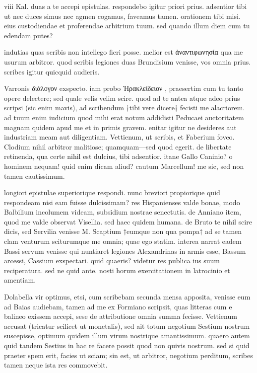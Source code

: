 


 viii Kal. duas a te accepi epistulas. respondebo igitur priori prius. adsentior tibi ut nec duces simus nec agmen cogamus, faveamus tamen. orationem tibi misi. eius custodiendae et proferendae arbitrium tuum. sed quando illum diem cum tu edendam putes?

 indutias quas scribis non intellego fieri posse. melior est ἀναντιφωνησία qua me usurum arbitror. quod scribis legiones duas Brundisium venisse, vos omnia prius. scribes igitur quicquid audieris.

 Varronis διάλογον exspecto. iam probo Ἡρακλείδειον , praesertim cum tu tanto opere delectere; sed quale velis velim scire. quod ad te antea atque adeo prius scripsi (sic enim mavis), ad scribendum †tibi vere dicere† fecisti me alacriorem. ad tuum enim iudicium quod mihi erat notum addidisti Peducaei auctoritatem magnam quidem apud me et in primis gravem. enitar igitur ne desideres aut industriam meam aut diligentiam. Vettienum, ut scribis, et Faberium foveo. Clodium nihil arbitror malitiose; quamquam—sed quod egerit. de libertate retinenda, qua certe nihil est dulcius, tibi adsentior. itane Gallo Caninio? o hominem nequam! quid enim dicam aliud? cautum Marcellum! me sic, sed non tamen cautissimum.

 longiori epistulae superiorique respondi. nunc breviori propiorique quid respondeam nisi eam fuisse dulcissimam? res Hispanienses valde bonae, modo Balbilium incolumem videam, subsidium nostrae senectutis. de Anniano item, quod me valde observat Visellia. sed haec quidem humana. de Bruto te nihil scire dicis, sed Servilia venisse M. Scaptium †eumque non qua pompa† ad se tamen clam venturum sciturumque me omnia; quae ego statim. interea narrat eadem Bassi servum venisse qui nuntiaret legiones Alexandrinas in armis esse, Bassum arcessi, Cassium exspectari. quid quaeris? videtur res publica ius suum reciperatura. sed ne quid ante. nosti horum exercitationem in latrocinio et amentiam.

 Dolabella vir optimus, etsi, cum scribebam secunda mensa apposita, venisse eum ad Baias audiebam, tamen ad me ex Formiano scripsit, quas litteras cum e balineo exissem accepi, sese de attributione omnia summa fecisse. Vettienum accusat (tricatur scilicet ut monetalis), sed ait totum negotium Sestium nostrum suscepisse, optimum quidem illum virum nostrique amantissimum. quaero autem quid tandem Sestius in hac re facere possit quod non quivis nostrum. sed si quid praeter spem erit, facies ut sciam; sin est, ut arbitror, negotium perditum, scribes tamen neque ista res commovebit.


